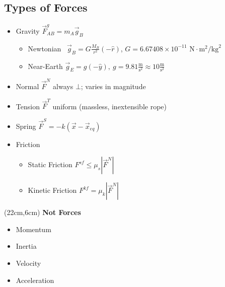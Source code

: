 \documentclass[]{article}
\begin{document}
\begin{PresentSpace}
\vspace{-10pt}
\section*{Types of Forces}
\vspace{-10pt}
\begin{itemize}
	\item Gravity \qquad \qquad \qquad \qquad $\vec{F}^{g}_{AB} = m_{A}\vec{g}_{B}$
	\begin{itemize}
		\item Newtonian \qquad\ $\vec{g}_{B} = G\frac{M_{B}}{r^{2}}(-\hat{r})$, $G = 6.67408\times10^{-11}\text{ N}\cdot\text{m}^{2}/\text{kg}^{2}$
		\item Near-Earth \qquad $\vec{g}_{E} = g(-\hat{y}),\ g=9.81\frac{\text{m}}{\text{s}^{2}} \approx 10\frac{\text{m}}{\text{s}^{2}}$
	\end{itemize}
	\item Normal \qquad $\vec{F}^{N}$ always $\bot$; varies in magnitude
	\item Tension \qquad $\vec{F}^{T}$ uniform (massless, inextensible rope)
	\item Spring \qquad $\vec{F}^{S}=-k(\vec{x}-\vec{x}_{eq})$
	\item Friction
	\begin{itemize}
		\item Static Friction \qquad $F^{sf}\leq\mu_{s}|\vec{F}^{N}|$
		\item Kinetic Friction \qquad $F^{kf}=\mu_{k}|\vec{F}^{N}|$
	\end{itemize}
\end{itemize}
\end{PresentSpace}
\begin{textblock*}{5cm}(22cm,6cm)
	\Large
	\noindent\textbf{Not Forces}
	\begin{itemize}
		\normalsize
		\item Momentum
		\item Inertia
		\item Velocity
		\item Acceleration
	\end{itemize}
\end{textblock*}
\newpage
\begin{TeacherMargin}

\end{TeacherMargin}
\end{document}
